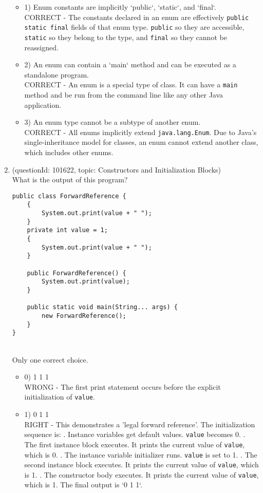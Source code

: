 \documentclass[12pt]{article}
\begin{document}
\begin{enumerate}[label=(\arabic*)]
\begin{itemize}
\item 1) Enum constants are implicitly `public`, `static`, and `final`.
 \\ 
CORRECT - The constants declared in an enum are effectively \verb|public static final| fields of that enum type. \verb|public| so they are accessible, \verb|static| so they belong to the type, and \verb|final| so they cannot be reassigned.

\item 2) An enum can contain a `main` method and can be executed as a standalone program.
 \\ 
CORRECT - An enum is a special type of class. It can have a \verb|main| method and be run from the command line like any other Java application.

\item 3) An enum type cannot be a subtype of another enum.
 \\ 
CORRECT - All enums implicitly extend \verb|java.lang.Enum|. Due to Java's single-inheritance model for classes, an enum cannot extend another class, which includes other enums.

\end{itemize}
\item (questionId: 101622, topic: Constructors and Initialization Blocks) \\ 
What is the output of this program?\n\begin{verbatim}
public class ForwardReference {
    {
        System.out.print(value + " ");
    }
    private int value = 1;
    {
        System.out.print(value + " ");
    }

    public ForwardReference() {
        System.out.print(value);
    }

    public static void main(String... args) {
        new ForwardReference();
    }
}
\end{verbatim}
\\ \noindent Only one correct choice. 
\begin{itemize}
\item 0) 1 1 1
 \\ 
WRONG - The first print statement occurs before the explicit initialization of \verb|value|.

\item 1) 0 1 1
 \\ 
RIGHT - This demonstrates a 'legal forward reference'. The initialization sequence is: . Instance variables get default values. \verb|value| becomes 0. . The first instance block executes. It prints the current value of \verb|value|, which is 0. . The instance variable initializer runs. \verb|value| is set to 1. . The second instance block executes. It prints the current value of \verb|value|, which is 1. . The constructor body executes. It prints the current value of \verb|value|, which is 1. \newline The final output is `0 1 1`.


\end{itemize}
\end{enumerate}
\end{document}
